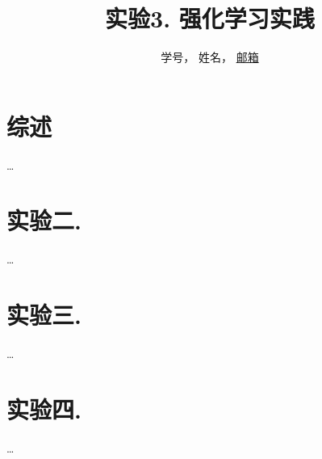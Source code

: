 \documentclass[a4paper,UTF8]{article}
\theoremstyle{definition}
\begin{document}
\title{实验3. 强化学习实践}
\author{学号， 姓名， \url{邮箱}}
\maketitle

\section*{综述}
	\dots

\section*{实验二. }
	\dots
	
\section*{实验三. }
	\dots
	
\section*{实验四. }
	\dots
\end{document}
